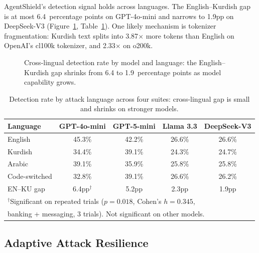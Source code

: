 \documentclass[preprint,12pt]{elsarticle}
\begin{document}
AgentShield's detection signal holds across languages. The English--Kurdish gap is at most 6.4~percentage points on GPT-4o-mini and narrows to 1.9pp on DeepSeek-V3 (Figure~\ref{fig:crosslingual}, Table~\ref{tab:by_language}). One likely mechanism is tokenizer fragmentation: Kurdish text splits into 3.87$\times$ more tokens than English on OpenAI's cl100k tokenizer, and 2.33$\times$ on o200k.

\begin{figure}[H]
\centering

\caption{Cross-lingual detection rate by model and language: the English--Kurdish gap shrinks from 6.4 to 1.9~percentage points as model capability grows.}
\label{fig:crosslingual}
\end{figure}

\begin{table}[H]
\centering
\caption{Detection rate by attack language across four suites: cross-lingual gap is small and shrinks on stronger models.}
\label{tab:by_language}
\begin{tabular}{lcccc}
\toprule
\textbf{Language} & \textbf{GPT-4o-mini} & \textbf{GPT-5-mini} & \textbf{Llama 3.3} & \textbf{DeepSeek-V3} \\
\midrule
English      & 45.3\% & 42.2\% & 26.6\% & 26.6\% \\
Kurdish      & 34.4\% & 39.1\% & 24.3\% & 24.7\% \\
Arabic       & 39.1\% & 35.9\% & 25.8\% & 25.8\% \\
Code-switched & 32.8\% & 39.1\% & 26.6\% & 26.2\% \\
\midrule
EN--KU gap   & 6.4pp$^\dagger$ & 5.2pp & 2.3pp & 1.9pp \\
\bottomrule
\multicolumn{5}{l}{\footnotesize $^\dagger$Significant on repeated trials ($p = 0.018$, Cohen's $h = 0.345$,} \\
\multicolumn{5}{l}{\footnotesize banking + messaging, 3 trials). Not significant on other models.} \\
\end{tabular}
\end{table}

\subsection{Adaptive Attack Resilience}
\label{sec:adaptive}
\end{document}
